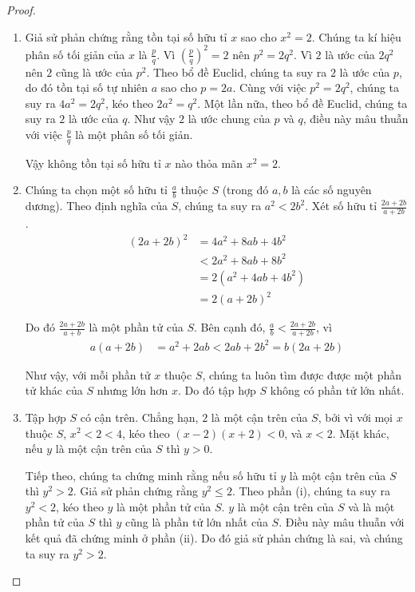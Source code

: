 \begin{proof}
    \begin{enumerate}[label={(\roman*)}]
        \item Giả sử phản chứng rằng tồn tại số hữu tỉ $x$ sao cho $x^{2} = 2$. Chúng ta kí hiệu phân số tối giản của $x$ là $\frac{p}{q}$. Vì ${\left(\frac{p}{q}\right)}^{2} = 2$ nên $p^{2} = 2q^{2}$. Vì $2$ là ước của $2q^{2}$ nên $2$ cũng là ước của $p^{2}$. Theo bổ đề Euclid, chúng ta suy ra $2$ là ước của $p$, do đó tồn tại số tự nhiên $a$ sao cho $p = 2a$. Cùng với việc $p^{2} = 2q^{2}$, chúng ta suy ra $4a^{2} = 2q^{2}$, kéo theo $2a^{2} = q^{2}$. Một lần nữa, theo bổ đề Euclid, chúng ta suy ra $2$ là ước của $q$. Như vậy $2$ là ước chung của $p$ và $q$, điều này mâu thuẫn với việc $\frac{p}{q}$ là một phân số tối giản.

              Vậy không tồn tại số hữu tỉ $x$ nào thỏa mãn $x^{2} = 2$.
        \item Chúng ta chọn một số hữu tỉ $\frac{a}{b}$ thuộc $S$ (trong đó $a, b$ là các số nguyên dương). Theo định nghĩa của $S$, chúng ta suy ra $a^{2} < 2b^{2}$. Xét số hữu tỉ $\frac{2a + 2b}{a + 2b}$.
              \begin{align*}
                  {(2a + 2b)}^{2} & = 4a^{2} + 8ab + 4b^{2}   \\
                                  & < 2a^{2} + 8ab + 8b^{2}   \\
                                  & = 2(a^{2} + 4ab + 4b^{2}) \\
                                  & = 2{(a + 2b)}^{2}
              \end{align*}

              Do đó $\frac{2a + 2b}{a + b}$ là một phần tử của $S$. Bên cạnh đó, $\frac{a}{b} < \frac{2a + 2b}{a + 2b}$, vì
              \begin{align*}
                  a(a + 2b) & = a^{2} + 2ab < 2ab + 2b^{2} = b(2a + 2b)
              \end{align*}

              Như vậy, với mỗi phần tử $x$ thuộc $S$, chúng ta luôn tìm được được một phần tử khác của $S$ nhưng lớn hơn $x$. Do đó tập hợp $S$ không có phần tử lớn nhất.
        \item Tập hợp $S$ có cận trên. Chẳng hạn, $2$ là một cận trên của $S$, bởi vì với mọi $x$ thuộc $S$, $x^{2} < 2 < 4$, kéo theo $(x - 2)(x + 2) < 0$, và $x < 2$. Mặt khác, nếu $y$ là một cận trên của $S$ thì $y > 0$.

              Tiếp theo, chúng ta chứng minh rằng nếu số hữu tỉ $y$ là một cận trên của $S$ thì $y^{2} > 2$. Giả sử phản chứng rằng $y^{2}\leq 2$. Theo phần (i), chúng ta suy ra $y^{2} < 2$, kéo theo $y$ là một phần tử của $S$. $y$ là một cận trên của $S$ và là một phần tử của $S$ thì $y$ cũng là phần tử lớn nhất của $S$. Điều này mâu thuẫn với kết quả đã chứng minh ở phần (ii). Do đó giả sử phản chứng là sai, và chúng ta suy ra $y^{2} > 2$.


\end{enumerate}
\end{proof}

